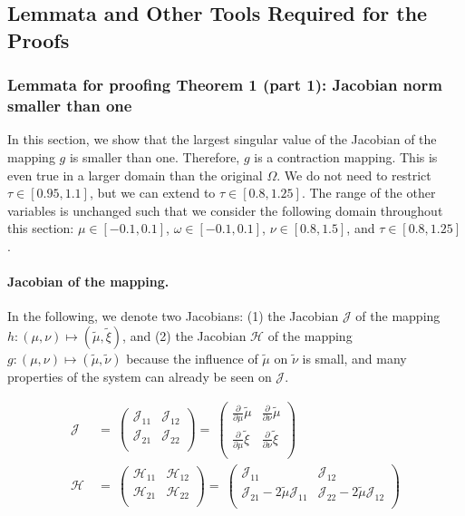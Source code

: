 \documentclass{article}
\newcommand\munn{{\tilde \mu}}
\newcommand\nunn{{\tilde \nu}}
\newcommand\xinn{{\tilde \xi}}
\begin{document}
\subsection{Lemmata and Other Tools Required for the Proofs} 

\subsubsection{Lemmata for proofing Theorem 1 (part 1): Jacobian norm smaller than one} 
\label{sec:S}
In this section, we show that the largest singular value of the Jacobian of the 
mapping $g$ is smaller than one. Therefore, $g$ is a contraction mapping. 
This is even true in a larger domain than the original $\Omega$. We 
do not need to restrict $\tau \in [0.95,1.1]$, but we can extend to
$\tau \in [0.8,1.25]$. The range of the other variables is unchanged such that 
we consider the following domain throughout this section: $\mu \in [-0.1,0.1]$,
$\omega \in [-0.1,0.1]$,
$\nu \in [0.8,1.5]$, and
$\tau \in [0.8,1.25]$. 

\paragraph{Jacobian of the mapping.}
In the following, we denote two Jacobians: 
(1) the Jacobian $\mathcal J$ of the mapping  $h:(\mu,\nu) \mapsto (\munn,\xinn)$, and
(2) the Jacobian $\mathcal H$ of the mapping $g:(\mu,\nu) \mapsto (\munn,\nunn)$
because the influence of $\munn$ on $\nunn$ is small, 
and many properties of the system can already be seen on $\mathcal J$. 


\begin{align}
\mathcal J \ &= \ \left(
\begin{array}{cc}
{\mathcal J}_{11} & {\mathcal J}_{12} \\
 {\mathcal J}_{21} & {\mathcal J}_{22} \\
\end{array}
\right) = 
\ \left(
\begin{array}{cc}
\frac{\partial }{\partial \mu} \munn & \frac{\partial }{\partial \nu} \munn \\
 \frac{\partial }{\partial \mu} \xinn  & \frac{\partial }{\partial \nu} \xinn  \\
\end{array}
\right)
\\
\mathcal H \ &= \ \left(
\begin{array}{cc}
{\mathcal H}_{11} & {\mathcal H}_{12} \\
 {\mathcal H}_{21} & {\mathcal H}_{22} \\
\end{array}
\right) = 
\ \left(
\begin{array}{cc}
{\mathcal J}_{11} & {\mathcal J}_{12} \\
 {\mathcal J}_{21} - 2 \munn {\mathcal J}_{11} & {\mathcal J}_{22} - 2 \munn {\mathcal J}_{12} \\
\end{array}
\right)
\end{align}
\end{document}
